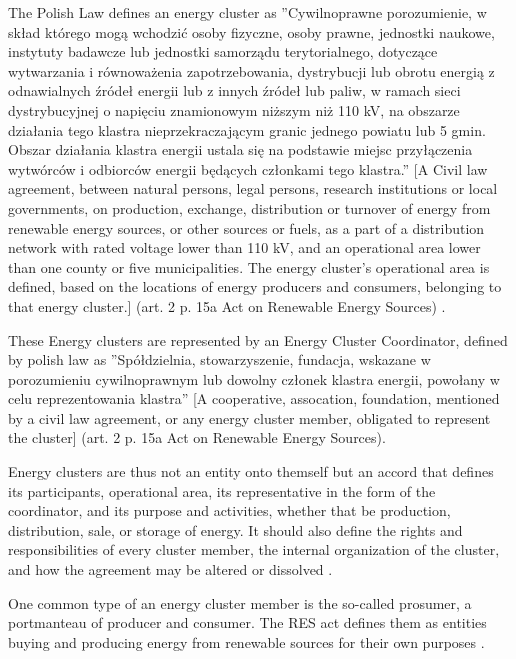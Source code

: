 \par The Polish Law defines an energy cluster as ''Cywilnoprawne porozumienie, w skład którego mogą wchodzić osoby fizyczne, osoby prawne, jednostki naukowe, instytuty badawcze lub jednostki samorządu terytorialnego, dotyczące wytwarzania i równoważenia zapotrzebowania, dystrybucji lub obrotu energią z odnawialnych źródeł energii lub z innych źródeł lub paliw, w ramach sieci dystrybucyjnej o napięciu znamionowym niższym niż 110 kV, na obszarze działania tego klastra nieprzekraczającym granic jednego powiatu lub 5 gmin. Obszar działania klastra energii ustala się na podstawie miejsc przyłączenia wytwórców i odbiorców energii będących członkami tego klastra.'' [A Civil law agreement, between natural persons, legal persons, research institutions or local governments, on production, exchange, distribution or turnover of energy from renewable energy sources, or other sources or fuels, as a part of a distribution network with rated voltage lower than 110 kV, and an operational area lower than one county or five municipalities. The energy cluster's operational area is defined, based on the locations of energy producers and consumers, belonging to that energy cluster.]  (art. 2 p. 15a Act on Renewable Energy Sources) \citep{RESAct}.
\par These Energy clusters are represented by an Energy Cluster Coordinator, defined by polish law as ''Spółdzielnia, stowarzyszenie, fundacja, wskazane w porozumieniu cywilnoprawnym lub dowolny członek klastra energii, powołany w celu reprezentowania klastra'' [A cooperative, assocation, foundation, mentioned by a civil law agreement, or any energy cluster member, obligated to represent the cluster] (art. 2 p. 15a Act on Renewable Energy Sources)\citep{RESAct}.
\par Energy clusters are thus not an entity onto themself but an accord that defines its participants, operational area, its representative in the form of the coordinator, and its purpose and activities, whether that be production, distribution, sale, or storage of energy. It should also define the rights and responsibilities of every cluster member, the internal organization of the cluster, and how the agreement may be altered or dissolved \citep{ksiazka}.
\par One common type of an energy cluster member is the so-called prosumer, a portmanteau of producer and consumer. The RES act defines them as entities buying and producing energy from renewable sources for their own purposes \citep{Prosumer} \citep{RESAct}. 

